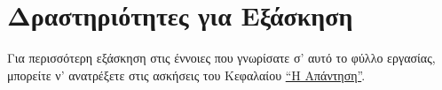 \documentclass[a4paper,11pt,oneside]{book}
\begin{document}


\section{Δραστηριότητες για Εξάσκηση}

%
Για περισσότερη εξάσκηση στις έννοιες που γνωρίσατε σ' αυτό το φύλλο εργασίας, μπορείτε ν' ανατρέξετε στις ασκήσεις του %
Κεφαλαίου \href{http://pythonies.mysch.gr/chapters/answer.pdf}{``Η Απάντηση''}.
\end{document}

